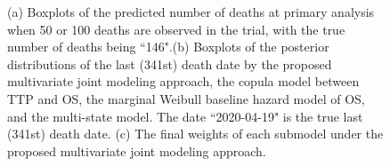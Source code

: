 \documentclass[aoas]{imsart}
\theoremstyle{plain}
\theoremstyle{remark}
\begin{document}
\begin{figure}
\centering
{}
\hfill
{}
\hfill
{}
\caption{\footnotesize (a) Boxplots of the predicted number of deaths at primary analysis when 50 or 100 deaths are observed in the trial, with the true number of deaths being ``146".(b) Boxplots of the posterior distributions of the last (341st) death date by the proposed multivariate joint modeling approach, the copula model between TTP and OS, the marginal Weibull baseline hazard model of OS, and the multi-state model. The date ``2020-04-19" is the true last (341st) death date. (c) The final weights of each submodel under the proposed multivariate joint modeling approach.}
\end{figure}
\end{document}
